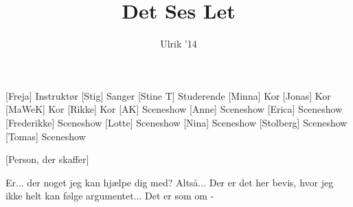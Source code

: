 \documentclass[a4paper,11pt]{article}
\title{Det Ses Let}
\author{Ulrik '14}
\begin{document}
\maketitle

\begin{roles}
[Freja] Instruktør
[Stig] Sanger
[Stine T] Studerende
[Minna] Kor
[Jonas] Kor
[MaWeK] Kor
[Rikke] Kor
[AK] Sceneshow
[Anne] Sceneshow
[Erica] Sceneshow
[Frederikke] Sceneshow
[Lotte] Sceneshow
[Nina] Sceneshow
[Stolberg] Sceneshow
[Tomas] Sceneshow

\end{roles}

\begin{props}
[Person, der skaffer]
\end{props}

\begin{sketch}
	 Er... der noget jeg kan hjælpe dig med?
	 Altså... Der er det her bevis, hvor jeg ikke helt kan følge argumentet... Det er som om -
\end{sketch}
\end{document}
